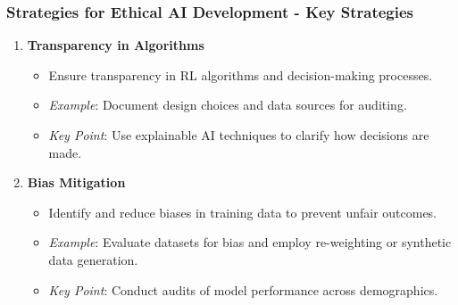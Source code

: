 \documentclass[aspectratio=169]{beamer}
\begin{document}
\begin{frame}[fragile]
    \frametitle{Strategies for Ethical AI Development - Key Strategies}
    \begin{enumerate}
        \item \textbf{Transparency in Algorithms}
            \begin{itemize}
                \item Ensure transparency in RL algorithms and decision-making processes.
                \item \textit{Example}: Document design choices and data sources for auditing.
                \item \textit{Key Point}: Use explainable AI techniques to clarify how decisions are made.
            \end{itemize}
        
        \item \textbf{Bias Mitigation}
            \begin{itemize}
                \item Identify and reduce biases in training data to prevent unfair outcomes.
                \item \textit{Example}: Evaluate datasets for bias and employ re-weighting or synthetic data generation.
                \item \textit{Key Point}: Conduct audits of model performance across demographics.
            \end{itemize}
    \end{enumerate}
\end{frame}
\end{document}
